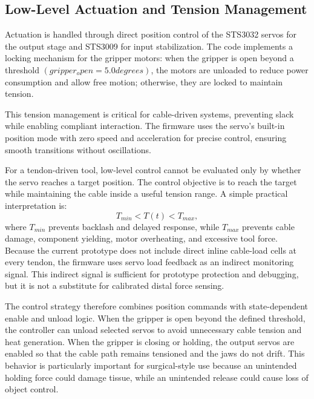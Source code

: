 \subsection{Low-Level Actuation and Tension Management}
Actuation is handled through direct position control of the STS3032 servos for the output stage and STS3009 for input stabilization. The code implements a locking mechanism for the gripper motors: when the gripper is open beyond a threshold $(gripper_open = 5.0 degrees)$, the motors are unloaded to reduce power consumption and allow free motion; otherwise, they are locked to maintain tension.

This tension management is critical for cable-driven systems, preventing slack while enabling compliant interaction. The firmware uses the servo's built-in position mode with zero speed and acceleration for precise control, ensuring smooth transitions without oscillations.

For a tendon-driven tool, low-level control cannot be evaluated only by whether the servo reaches a target position. The control objective is to reach the target while maintaining the cable inside a useful tension range. A simple practical interpretation is:
\[
T_{min}<T(t)<T_{max},
\]
where $T_{min}$ prevents backlash and delayed response, while $T_{max}$ prevents cable damage, component yielding, motor overheating, and excessive tool force. Because the current prototype does not include direct inline cable-load cells at every tendon, the firmware uses servo load feedback as an indirect monitoring signal. This indirect signal is sufficient for prototype protection and debugging, but it is not a substitute for calibrated distal force sensing.

The control strategy therefore combines position commands with state-dependent enable and unload logic. When the gripper is open beyond the defined threshold, the controller can unload selected servos to avoid unnecessary cable tension and heat generation. When the gripper is closing or holding, the output servos are enabled so that the cable path remains tensioned and the jaws do not drift. This behavior is particularly important for surgical-style use because an unintended holding force could damage tissue, while an unintended release could cause loss of object control.

